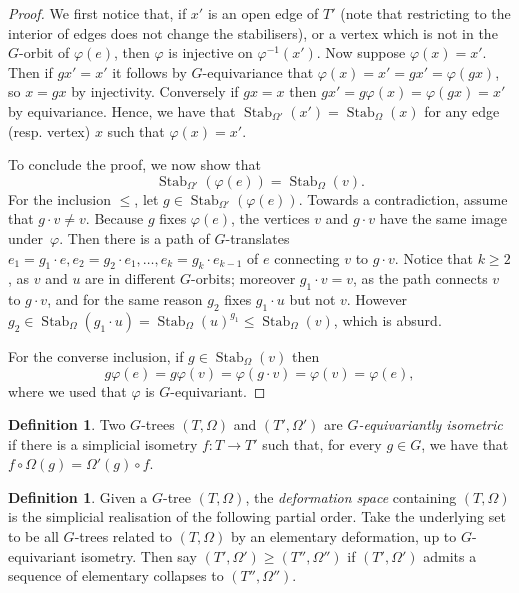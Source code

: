 \documentclass[svgnames]{amsart}
\theoremstyle{plain}
\theoremstyle{definition}
\newtheorem{defn}[thm]{Definition}
\newcommand{\Stab}[2]{\operatorname{Stab}_{#1}\left(#2\right)}
\renewcommand{\phi}{\varphi}
\begin{document}
\begin{proof}
We first notice that, if $x'$ is an open edge of $T'$ (note that restricting to the interior of edges does not change the stabilisers), or a vertex which is not in the $G$-orbit of $\phi(e)$, then $\phi$ is injective on $\phi^{-1}(x')$. Now suppose $\phi(x) = x'$. Then if $gx' = x'$ it follows by $G$-equivariance that $\phi(x)= x'= gx' = \phi(gx)$, so $x = gx$ by injectivity. Conversely if $gx = x$ then $gx' = g\phi(x) = \phi(gx) = x'$ by equivariance. Hence, we have that $\Stab{\Omega'}{x'}=\Stab{\Omega}{x}$ for any edge (resp. vertex) $x$ such that $\phi(x) = x'$.

    
To conclude the proof, we now show that
\begin{equation}\label{eq:stab_phi(e)}
    \Stab{\Omega'}{\phi(e)}=\Stab{\Omega}{v}.
\end{equation}
    For the inclusion $\le$, let $g\in \Stab{\Omega'}{\phi(e)}$. Towards a contradiction, assume that $g\cdot v\neq v$. Because $g$ fixes $\phi(e)$, the vertices $v$ and $g\cdot v$ have the same image under~$\phi$. Then there is a path of $G$-translates $e_1=g_1\cdot e, e_2=g_2\cdot e_1,\ldots, e_k=g_k \cdot e_{k-1}$ of $e$ connecting $v$ to $g\cdot v$. Notice that $k\ge 2$, as $v$ and $u$ are in different $G$-orbits; moreover $g_1\cdot v=v$, as the path connects $v$ to $g\cdot v$, and for the same reason $g_2$ fixes $g_1 \cdot u$ but not $v$. However $g_2 \in \Stab{\Omega}{g_1 \cdot u}=\Stab{\Omega}{u}^{g_1}\le \Stab{\Omega}{v}$, which is absurd.

    For the converse inclusion, if $g\in \Stab{\Omega}{v}$ then $$g\phi(e)=g\phi(v)=\phi(g\cdot v)=\phi(v)=\phi(e),$$
    where we used that $\phi$ is $G$-equivariant.
\end{proof}
\begin{defn}
    Two $G$-trees $(T,\Omega)$ and $(T',\Omega')$ are \emph{$G$-equivariantly isometric} if there is a simplicial isometry $f\colon T\to T'$ such that, for every $g\in G$, we have that $f\circ \Omega(g)=\Omega'(g) \circ f$.
\end{defn}
\begin{defn}\label{defn:deformation space}
Given a $G$-tree $(T, \Omega)$, the \emph{deformation space} containing $(T, \Omega)$ is the simplicial realisation of the following partial order. Take the underlying set to be all $G$-trees related to $(T,\Omega)$ by an elementary deformation, up to $G$-equivariant isometry. Then say $(T', \Omega') \geq (T'', \Omega'')$ if $(T', \Omega')$ admits a sequence of elementary collapses to $(T'', \Omega'')$.
\end{defn}
\end{document}

